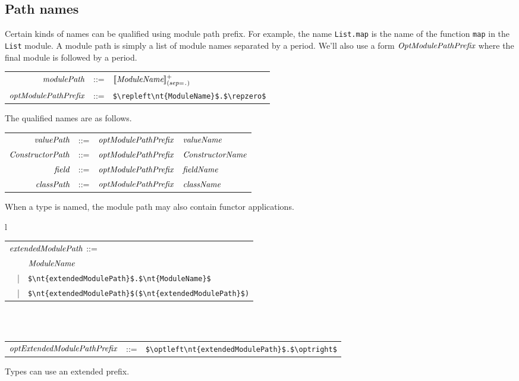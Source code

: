 \subsection{Path names}

Certain kinds of names can be qualified using module path prefix.  For example, the name
\hbox{\lstinline/List.map/} is the name of the function \hbox{\lstinline/map/} in the \hbox{\lstinline/List/} module.
A module path is simply a list of module names separated by a period.  We'll also use a form
$\textit{\rmfamily OptModulePathPrefix}$ where the final module is followed by a period.

\begin{center}
\begin{tabular}{rcl}
$\textit{\rmfamily modulePath}$ & ::= & $[\![\textit{\rmfamily ModuleName}]\!]^{+}_{({\footnotesize sep=}\texttt{.})}$\\
$\textit{\rmfamily optModulePathPrefix}$ & ::= & \hbox{\lstinline/$\repleft\nt{ModuleName}$.$\repzero$/}
\end{tabular}
\end{center}
%
The qualified names are as follows.

\begin{center}
\begin{tabular}{rcll}
$\textit{\rmfamily valuePath}$ & ::= & $\textit{\rmfamily optModulePathPrefix}$ & $\textit{\rmfamily valueName}$\\
$\textit{\rmfamily ConstructorPath}$ & ::= & $\textit{\rmfamily optModulePathPrefix}$ & $\textit{\rmfamily ConstructorName}$\\
$\textit{\rmfamily field}$ & ::= & $\textit{\rmfamily optModulePathPrefix}$ & $\textit{\rmfamily fieldName}$\\
$\textit{\rmfamily classPath}$ & ::= & $\textit{\rmfamily optModulePathPrefix}$ & $\textit{\rmfamily className}$
\end{tabular}
\end{center}
%
When a type is named, the module path may also contain functor applications.

\begin{center}
\begin{tabular}{l}
\begin{tabular}{rcl}
\multicolumn{3}{l}{$\textit{\rmfamily extendedModulePath}$ ::=}\\
&   & $\textit{\rmfamily ModuleName}$\\
& | & \hbox{\lstinline/$\nt{extendedModulePath}$.$\nt{ModuleName}$/}\\
& | & \hbox{\lstinline/$\nt{extendedModulePath}$($\nt{extendedModulePath}$)/}
\end{tabular}
\\
\\
\begin{tabular}{rcl}
$\textit{\rmfamily optExtendedModulePathPrefix}$ & ::= & \hbox{\lstinline/$\optleft\nt{extendedModulePath}$.$\optright$/}
\end{tabular}
\end{tabular}
\end{center}
%
Types can use an extended prefix.

